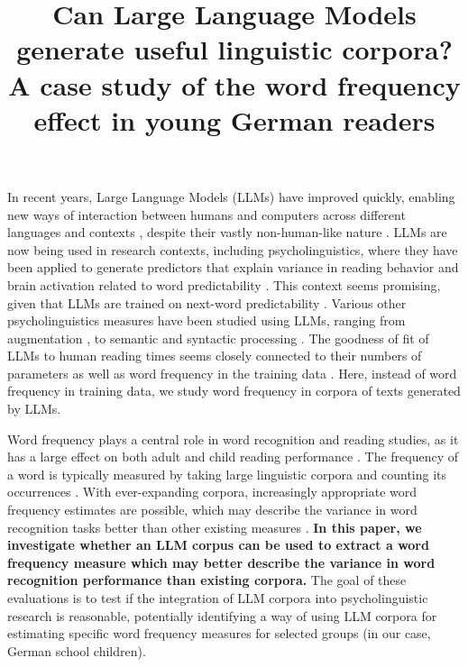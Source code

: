 \documentclass[doc, a4paper, anonymous]{apa7}
\title{Can Large Language Models generate useful linguistic corpora? A case study of the word frequency effect in young German readers}
\begin{document}
\maketitle

In recent years, Large Language Models (LLMs) have improved quickly, enabling new ways of interaction between humans and computers \citep{bommasani_opportunities_2022} across different languages and contexts \citep{chang_when_2023, lai_chatgpt_2023}, despite their vastly non-human-like nature \citep{min_recent_2021, singhal_large_2023, evanson_language_2023, kasneci_chatgpt_2023}. LLMs are now being used in research contexts, including psycholinguistics, where they have been applied to generate predictors that explain variance in reading behavior and brain activation related to word predictability \citep{hofmann_language_2022, boeve_systematic_2024, botch_humans_2024, lopes_rego_language_2024, chandra_synthetic_2023, heilbron_lexical_2023}. This context seems promising, given that LLMs are trained on next-word predictability \citep{tay2022efficienttransformerssurvey}. Various other psycholinguistics measures have been studied using LLMs, ranging from augmentation \citep{trott_can_2024}, to semantic \citep{caucheteux_brains_2022} and syntactic processing \citep{fresen_language_2024,desbordes_dimensionality_2023}. The goodness of fit of LLMs to human reading times seems closely connected to their numbers of parameters \citep{oh_why_2023} as well as word frequency in the training data \citep{oh_frequency_2024,oh_dissociable_2025}. Here, instead of word frequency in training data, we study word frequency in corpora of texts generated by LLMs. 

Word frequency plays a central role in word recognition and reading studies, as it has a large effect on both adult and child reading performance \citep{brysbaert_impact_2016,brysbaert_word_2018,gregorova_access_2023,schroter_developmental_2017, kliegl_length_2004,hawelka_dual-route_2010}. The frequency of a word is typically measured by taking large linguistic corpora and counting its occurrences \citep[e.g., see ][]{brysbaert_word_2011,baayen_celex_1993,schroeder_childlex_2015,heister_dlexdb_2011}. With ever-expanding corpora, increasingly appropriate word frequency estimates are possible, which may describe the variance in word recognition tasks better than other existing measures \citep{brysbaert_word_2011}. \textbf{In this paper, we investigate whether an LLM corpus can be used to extract a word frequency measure which may better describe the variance in word recognition performance than existing corpora.} The goal of these evaluations is to test if the integration of LLM corpora into psycholinguistic research is reasonable, potentially identifying a way of using LLM corpora for estimating specific word frequency measures for selected groups (in our case, German school children).
\end{document}
